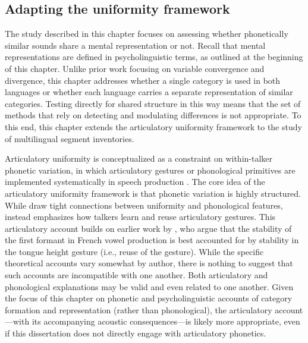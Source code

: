 \subsection{Adapting the uniformity framework}\label{ch4:sec:uniformity}

The study described in this chapter focuses on assessing whether phonetically similar sounds share a mental representation or not. Recall that mental representations are defined in psycholinguistic terms, as outlined at the beginning of this chapter. Unlike prior work focusing on variable convergence and divergence, this chapter addresses whether a single category is used in both languages or whether each language carries a separate representation of similar categories. Testing directly for shared structure in this way means that the set of methods that rely on detecting and modulating differences is not appropriate. To this end, this chapter extends the articulatory uniformity framework to the study of multilingual segment inventories. 

Articulatory uniformity is conceptualized as a constraint on within-talker phonetic variation, in which articulatory gestures or phonological primitives are implemented systematically in speech production \citep{chodroff_2017_structure, faytak_2018_uniformity, menard_2008_invariance}. The core idea of the articulatory uniformity framework is that phonetic variation is highly structured. While \citet{chodroff_2017_structure} draw tight connections between uniformity and phonological features, \citet{faytak_2018_uniformity} instead emphasizes how talkers learn and reuse articulatory gestures. This articulatory account builds on earlier work by \citet{menard_2008_invariance}, who argue that the stability of the first formant in French vowel production is best accounted for by stability in the tongue height gesture (i.e., reuse of the gesture). While the specific theoretical accounts vary somewhat by author, there is nothing to suggest that such accounts are incompatible with one another. Both articulatory and phonological explanations may be valid and even related to one another. Given the focus of this chapter on phonetic and psycholinguistic accounts of category formation and representation (rather than phonological), the articulatory account---with its accompanying acoustic consequences---is likely more appropriate, even if this dissertation does not directly engage with articulatory phonetics. 

